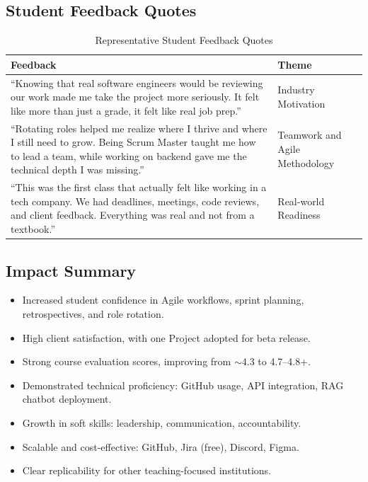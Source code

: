\documentclass{article}
\begin{document}
\subsection{Student Feedback Quotes}

\begin{table}[ht]
  \centering
  \tiny
\caption{Representative Student Feedback Quotes}
\label{tab:feedback}
\begin{tabular}{p{8cm}p{5cm}}
\hline
\textbf{Feedback} & \textbf{Theme} \\
\hline
``Knowing that real software engineers would be reviewing our work made me take the project more seriously. It felt like more than just a grade, it felt like real job prep.'' & Industry Motivation \\
``Rotating roles helped me realize where I thrive and where I still need to grow. Being Scrum Master taught me how to lead a team, while working on backend gave me the technical depth I was missing.'' & Teamwork and Agile Methodology \\
``This was the first class that actually felt like working in a tech company. We had deadlines, meetings, code reviews, and client feedback. Everything was real and not from a textbook.'' & Real-world Readiness \\
\hline
\end{tabular}
\end{table}

\subsection*{Impact Summary}
\begin{itemize}[noitemsep]
  \item Increased student confidence in Agile workflows, sprint planning, retrospectives, and role rotation.
  \item High client satisfaction, with one Project adopted for beta release.
  \item Strong course evaluation scores, improving from $\sim$4.3 to 4.7--4.8+.
  \item Demonstrated technical proficiency: GitHub usage, API integration, RAG chatbot deployment.
  \item Growth in soft skills: leadership, communication, accountability.
  \item Scalable and cost-effective: GitHub, Jira (free), Discord, Figma.
  \item Clear replicability for other teaching-focused institutions.
\end{itemize}
\end{document}
